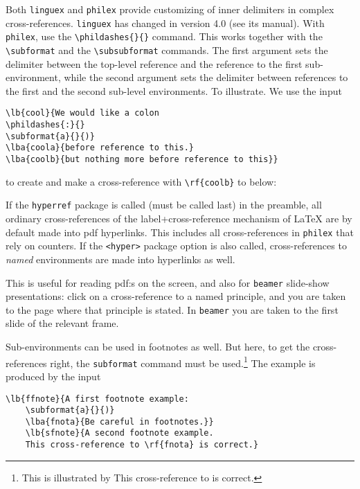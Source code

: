 \documentclass[10pt]{article}
\newcommand{\emp}{\emph}
\newcommand{\note}{\footnote}
\begin{document}
Both \verb+linguex+ and \verb+philex+  provide customizing of inner delimiters in complex cross-references. \verb+linguex+ has changed in version 4.0 (see its manual). With \verb+philex+, use the \verb+\phildashes{}{}+  command. This works together with the \verb+\subformat+ and the \verb+\subsubformat+ commands. The first argument sets the delimiter between the top-level reference and the reference to the first sub-environment, while the second argument sets the delimiter between references to the first and the second sub-level environments. To illustrate. We use the input
\begin{verbatim}
\lb{cool}{We would like a colon
\phildashes{:}{}
\subformat{a}{}{)}
\lba{coola}{before reference to this.}
\lba{coolb}{but nothing more before reference to this}}
\end{verbatim}
to create and make a cross-reference with \verb+\rf{coolb}+ to  below: 
	
If the \verb+hyperref+ package  is called (must be called last) in the preamble, all ordinary cross-references of the label+cross-reference mechanism of LaTeX are by default made into pdf hyperlinks. This includes all cross-references in \verb+philex+ that rely on counters. If the \verb+<hyper>+ package option is also called, cross-references to \emp{named} environments are made into hyperlinks as well.

This is useful for reading pdf:s on the screen, and also for \verb+beamer+ slide-show presentations: click on a cross-reference to a named principle, and you are taken to the page where that principle is stated. In \verb+beamer+ you are taken to the first slide of the relevant frame.

Sub-environments can  be used in footnotes as well. But here, to get the cross-references right,  the \verb+subformat+ command must be used.\note
	{This is illustrated by
	This cross-reference to  is correct.}
	The example is produced by the input
\begin{verbatim}
\lb{ffnote}{A first footnote example:
	\subformat{a}{}{)}
	\lba{fnota}{Be careful in footnotes.}}
	\lb{sfnote}{A second footnote example.
	This cross-reference to \rf{fnota} is correct.}
\end{verbatim}
 
\end{document}

